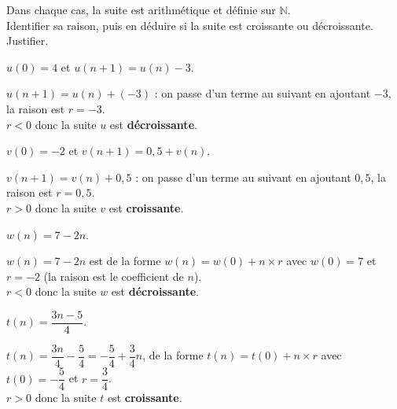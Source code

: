 \documentclass[11pt,a4paper]{article}  %
\begin{document}
Dans chaque cas, la suite est arithmétique et définie sur $\mathbb{N}$.\\
Identifier sa raison, puis en déduire si la suite est croissante ou décroissante. Justifier.
\begin{enumMet}
	\item $u(0)=4$ et $u(n+1)=u(n)-3$.
	\par
	\begin{corrBox}
		$u(n+1)=u(n)+(-3)$ : on passe d'un terme au suivant en ajoutant $-3$, la raison est $r=-3$.\\
		$r<0$ donc la suite $u$ est \textbf{décroissante}.
	\end{corrBox}

	\item $v(0)=-2$ et $v(n+1)=0,5+v(n)$.
	\par
	\begin{corrBox}
		$v(n+1)=v(n)+0,5$ : on passe d'un terme au suivant en ajoutant $0,5$, la raison est $r=0,5$.\\
		$r>0$ donc la suite $v$ est \textbf{croissante}.
	\end{corrBox}

	\item $w(n)=7-2n$.
	\par
	\begin{corrBox}
		$w(n)=7-2n$ est de la forme $w(n)=w(0)+n\times r$ avec $w(0)=7$ et $r=-2$ (la raison est le coefficient de $n$).\\
		$r<0$ donc la suite $w$ est \textbf{décroissante}.
	\end{corrBox}

	\item {} $t(n)=\dfrac{3n-5}{4}$.
	\par
	\begin{corrBox}
		$t(n)=\dfrac{3n}{4}-\dfrac{5}{4}=-\dfrac{5}{4}+\dfrac{3}{4}n$, de la forme $t(n)=t(0)+n\times r$ avec $t(0)=-\dfrac{5}{4}$ et $r=\dfrac{3}{4}$.\\
		$r>0$ donc la suite $t$ est \textbf{croissante}.
	\end{corrBox}
\end{enumMet}
\end{document}
